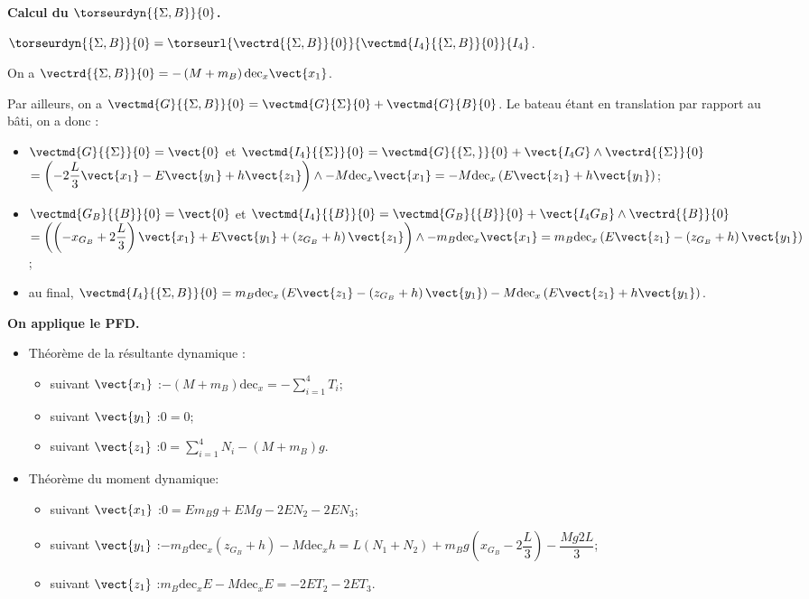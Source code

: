 \begin{multicols}{2}
\begin{corrige}
\textbf{Calcul du $\torseurdyn{\{\Sigma , B\}}{0}$.}

$\torseurdyn{\{\Sigma , B\}}{0} = \torseurl{\vectrd{\{\Sigma , B\}}{0}}{\vectmd{I_4}{\{\Sigma , B\}}{0}}{I_4}$. 

On a $\vectrd{\{\Sigma , B\}}{0}=-\left(M+m_B\right) \text{dec}_x\vect{x_1}$.

Par ailleurs, on a $\vectmd{G}{\{\Sigma , B\}}{0}= \vectmd{G}{\Sigma }{0}+\vectmd{G}{ B}{0}$.
Le bateau étant en translation par rapport au bâti, on a donc :

\begin{itemize}
\item  $\vectmd{G}{\{\Sigma \}}{0}=\vect{0}$ et 
$\vectmd{I_4}{\{\Sigma \}}{0}=\vectmd{G}{\{\Sigma ,\}}{0}+\vect{I_4 G} \wedge \vectrd{\{\Sigma \}}{0} $ $ =\left(-2\dfrac{L}{3} \vect{x_1}-E\vect{y_1}+h\vect{z_1} \right)\wedge -M\text{dec}_x \vect{x_1}=-M\text{dec}_x \left(E\vect{z_1}+h\vect{y_1}\right)$;
\item  $\vectmd{G_B}{\{ B\}}{0}=\vect{0}$ et 
$\vectmd{I_4}{\{ B\}}{0}=\vectmd{G_B}{\{ B\}}{0}+\vect{I_4 G_B} \wedge \vectrd{\{ B\}}{0} $ $=\left(\left(-x_{G_B}+2\dfrac{L}{3}\right) \vect{x_1}+E\vect{y_1}+\left(z_{G_B}+h\right) \vect{z_1} \right)\wedge -m_B \text{dec}_x \vect{x_1}=m_B \text{dec}_x \left(E\vect{z_1}-\left(z_{G_B}+h\right) \vect{y_1}\right)$; 
\item au final, $\vectmd{I_4}{\{\Sigma , B\}}{0}=m_B \text{dec}_x \left(E\vect{z_1}-\left(z_{G_B}+h\right) \vect{y_1}\right)-M\text{dec}_x \left(E\vect{z_1}+h\vect{y_1}\right)$.
\end{itemize}

\textbf{On applique le PFD.}
\begin{itemize}
\item Théorème de la résultante dynamique :
\begin{itemize}
\item suivant $\vect{x_1}$ :$-\left(M+m_B\right) \text{dec}_x=-\sum\limits_{i=1}^{4} T_i$;
\item suivant $\vect{y_1}$ :$0=0$;
\item suivant $\vect{z_1}$ :$0=\sum\limits_{i=1}^{4} N_i-\left(M+m_B\right)g$.
\end{itemize}
\item Théorème du moment dynamique:
\begin{itemize}
\item suivant $\vect{x_1}$ :$0=Em_B g+EM g-2EN_2-2EN_3 $;
\item suivant $\vect{y_1}$ :$-m_B \text{dec}_x \left(z_{G_B}+h\right)-M\text{dec}_x h=L\left(N_1+N_2 \right)+m_B g\left(x_{G_B}-2\dfrac{L}{3}\right)-\dfrac{M g2L}{3} $;
\item suivant $\vect{z_1}$ :$ m_B \text{dec}_x E-M\text{dec}_x E=-2ET_2-2ET_3$.
\end{itemize}
\end{itemize}



\end{corrige}
\end{multicols}
